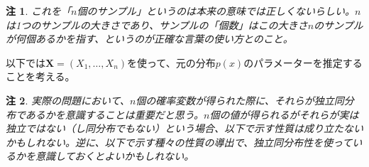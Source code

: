 \documentclass[uplatex,dvipdfmx]{jlreq}
\newtheorem{note}{注}
\begin{document}
\begin{note}
    これを「$n$個のサンプル」というのは本来の意味では正しくないらしい。$n$は1つのサンプルの大きさであり、サンプルの「個数」はこの大きさ$n$のサンプルが何個あるかを指す、というのが正確な言葉の使い方とのこと。
\end{note}

以下では$\boldsymbol{X}=(X_1, \dotsc, X_n)$を使って、元の分布$p(x)$のパラメーターを推定することを考える。

\begin{note}
    実際の問題において、$n$個の確率変数が得られた際に、それらが独立同分布であるかを意識することは重要だと思う。$n$個の値が得られるがそれらが実は独立ではない（し同分布でもない）という場合、以下で示す性質は成り立たないかもしれない。逆に、以下で示す種々の性質の導出で、独立同分布性を使っているかを意識しておくとよいかもしれない。
\end{note}
\end{document}
